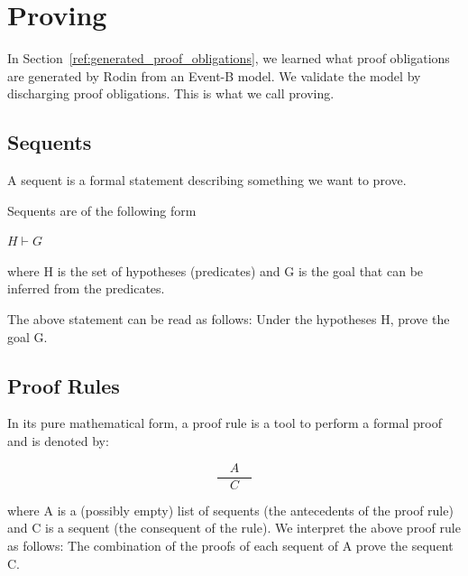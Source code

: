 \section{Proving}
\label{proving}

In Section~\ref{ref:generated_proof_obligations}, we learned what proof obligations are generated by Rodin from an Event-B model.  We validate the model by discharging proof obligations.  This is what we call proving.


\subsection{Sequents}
\label{sequents}

A sequent is a formal statement describing something we want to prove.

Sequents are of the following form 

$H \vdash G$

where H is the set of hypotheses (predicates) and G is the goal that can be inferred from the predicates.

The above statement can be read as follows: Under the hypotheses H, prove the goal G. 

\subsection{Proof Rules}
\label{proof_rules}

In its pure mathematical form, a proof rule is a tool to perform a formal proof and is denoted by: 

$$\frac{\quad A\quad}{C}$$

where A is a (possibly empty) list of sequents (the antecedents of the proof rule) and C is a sequent (the consequent of the rule). We interpret the above proof rule as follows: The combination of the proofs of each sequent of A prove the sequent C. 

